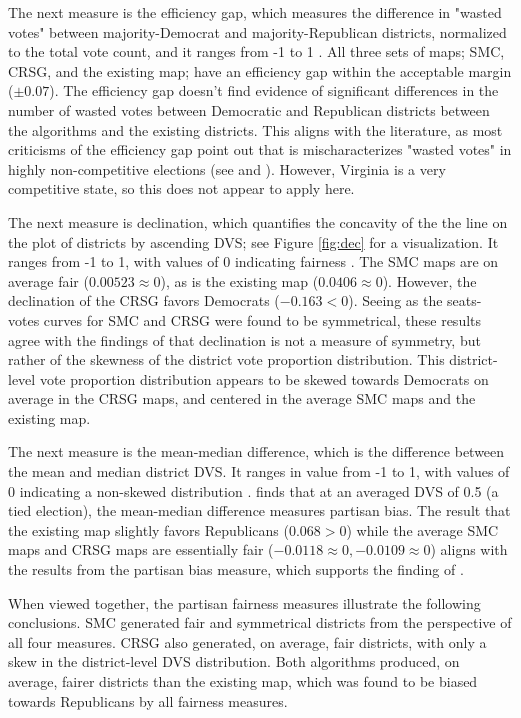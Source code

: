 The next measure is the efficiency gap, which measures the difference in "wasted votes" between majority-Democrat and majority-Republican districts, normalized to the total vote count, and it ranges from -1 to 1 \parencite{stephanopoulos2015}. All three sets of maps; SMC, CRSG, and the existing map; have an efficiency gap within the acceptable margin ($\pm 0.07$). The efficiency gap doesn't find evidence of significant differences in the number of wasted votes between Democratic and Republican districts between the algorithms and the existing districts. This aligns with the literature, as most criticisms of the efficiency gap point out that is mischaracterizes "wasted votes" in highly non-competitive elections (see \textcite{veomett2018} and \textcite{katz2020}). However, Virginia is a very competitive state, so this does not appear to apply here.

The next measure is declination, which quantifies the concavity of the the line on the plot of districts by ascending DVS; see Figure \ref{fig:dec} for a visualization. It ranges from -1 to 1, with values of 0 indicating fairness \parencite{warrington2018}. The SMC maps are on average fair ($0.00523 \approx 0$), as is the existing map ($0.0406 \approx 0$). However, the declination of the CRSG favors Democrats ($-0.163 < 0$). Seeing as the seats-votes curves for SMC and CRSG were found to be symmetrical, these results agree with the findings of \textcite{katz2020} that declination is not a measure of symmetry, but rather of the skewness of the district vote proportion distribution. This district-level vote proportion distribution appears to be skewed towards Democrats on average in the CRSG maps, and centered in the average SMC maps and the existing map. 

The next measure is the mean-median difference, which is the difference between the mean and median district DVS. It ranges in value from -1 to 1, with values of 0 indicating a non-skewed distribution \parencite{mcdonald2015}. \textcite{katz2020} finds that at an averaged DVS of 0.5 (a tied election), the mean-median difference measures partisan bias. The result that the existing map slightly favors Republicans ($0.068 > 0$) while the average SMC maps and CRSG maps are essentially fair ($-0.0118 \approx 0, -0.0109 \approx 0$) aligns with the results from the partisan bias measure, which supports the finding of \textcite{katz2020}. 

When viewed together, the partisan fairness measures illustrate the following conclusions. SMC generated fair and symmetrical districts from the perspective of all four measures. CRSG also generated, on average, fair districts, with only a skew in the district-level DVS distribution. Both algorithms produced, on average, fairer districts than the existing map, which was found to be biased towards Republicans by all fairness measures. 

